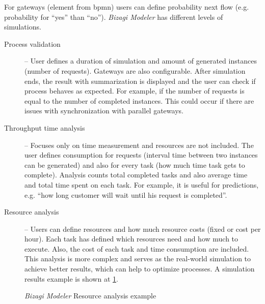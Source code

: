 For gateways (element from \gls{bpmn}) users can define probability next flow (e.g. probability for ``yes'' than ``no''). \textit{Bizagi Modeler} has different levels of simulations.
    \begin{description}
        \item[Process validation] -- User defines a duration of simulation and amount of generated instances (number of requests). Gateways are also configurable. After simulation ends, the result with summarization is displayed and the user can check if process behaves as expected. For example, if the number of requests is equal to the number of completed instances. This could occur if there are issues with synchronization with parallel gateways.
        \item[Throughput time analysis] -- Focuses only on time measurement and resources are not included. The user defines consumption for requests (interval time between two instances can be generated) and also for every task (how much time task gets to complete). Analysis counts total completed tasks and also average time and total time spent on each task. For example, it is useful for predictions, e.g. ``how long customer will wait until his request is completed''.
        \item[Resource analysis] -- Users can define resources and how much resource costs (fixed or cost per hour). Each task has defined which resources need and how much to execute. Also, the cost of each task and time consumption are included. This analysis is more complex and serves as the real-world simulation to achieve better results, which can help to optimize processes. A simulation results example is shown at \cref{fig:bizagi-example}.
    \end{description}

\begin{figure}[ht!]
    \centering
    \qquad
    \caption{\textit{Bizagi Modeler} Resource analysis example \cite{bizagi-user-guide}}%
    \label{fig:bizagi-example}%
\end{figure}
